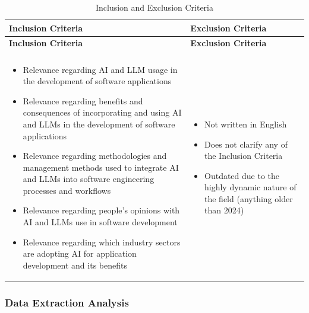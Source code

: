 {\small
\renewcommand{\arraystretch}{1.25}

\begin{longtable}{>{\centering\arraybackslash}p{10.5cm} | >{\centering\arraybackslash}p{4.5cm}}
\caption{Inclusion and Exclusion Criteria} \\
\toprule
\textbf{Inclusion Criteria} & \textbf{Exclusion Criteria} \\
\midrule
\endfirsthead

\toprule
\textbf{Inclusion Criteria} & \textbf{Exclusion Criteria} \\
\midrule
\endhead

\midrule
\multicolumn{2}{r}{\textit{Continued on next page}} \\
\midrule
\endfoot

\bottomrule
\endlastfoot

\begin{itemize}[leftmargin=0.6cm, rightmargin=0.6cm, topsep=-0.3cm, itemsep=0.6em]
\item Relevance regarding AI and LLM usage in the development of software applications
\item Relevance regarding benefits and consequences of incorporating and using AI and LLMs in the development of software applications
\item Relevance regarding methodologies and management methods used to integrate AI and LLMs into software engineering processes and workflows
\item Relevance regarding people's opinions with AI and LLMs use in software development
\item Relevance regarding which industry sectors are adopting AI for application development and its benefits
\end{itemize}
&
\begin{itemize}[leftmargin=0.6cm, rightmargin=0.6cm, topsep=-0.3cm, itemsep=0.6em]
\item Not written in English
\item Does not clarify any of the Inclusion Criteria
\item Outdated due to the highly dynamic nature of the field (anything older than 2024)
\end{itemize}
\\

\end{longtable}}


\subsubsection{Data Extraction Analysis}

